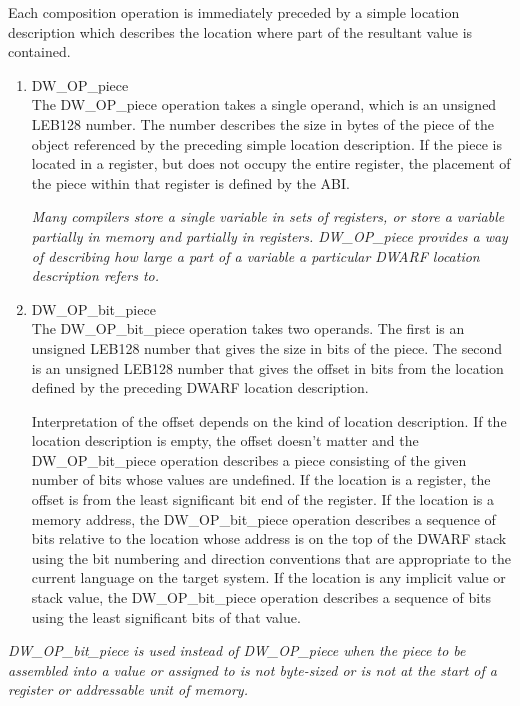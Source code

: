 Each composition operation is immediately preceded by a simple
location description which describes the location where part
of the resultant value is contained.

\begin{enumerate}[1]
\item DW\-\_OP\-\_piece \\
The DW\-\_OP\-\_piece operation takes a single operand, which is an
unsigned LEB128 number.  The number describes the size in bytes
of the piece of the object referenced by the preceding simple
location description. If the piece is located in a register,
but does not occupy the entire register, the placement of
the piece within that register is defined by the ABI.

\textit{Many compilers store a single variable in sets of registers,
or store a variable partially in memory and partially in
registers. DW\-\_OP\-\_piece provides a way of describing how large
a part of a variable a particular DWARF location description
refers to. }

\item DW\-\_OP\-\_bit\-\_piece \\
The DW\-\_OP\-\_bit\-\_piece operation takes two operands. The first
is an unsigned LEB128 number that gives the size in bits
of the piece. The second is an unsigned LEB128 number that
gives the offset in bits from the location defined by the
preceding DWARF location description.  

Interpretation of the
offset depends on the kind of location description. If the
location description is empty, the offset doesn’t matter and
the DW\-\_OP\-\_bit\-\_piece operation describes a piece consisting
of the given number of bits whose values are undefined. If
the location is a register, the offset is from the least
significant bit end of the register. If the location is a
memory address, the DW\-\_OP\-\_bit\-\_piece operation describes a
sequence of bits relative to the location whose address is
on the top of the DWARF stack using the bit numbering and
direction conventions that are appropriate to the current
language on the target system. If the location is any implicit
value or stack value, the DW\-\_OP\-\_bit\-\_piece operation describes
a sequence of bits using the least significant bits of that
value.  
\end{enumerate}

\textit{DW\-\_OP\-\_bit\-\_piece is used instead of DW\-\_OP\-\_piece when
the piece to be assembled into a value or assigned to is not
byte-sized or is not at the start of a register or addressable
unit of memory.}




